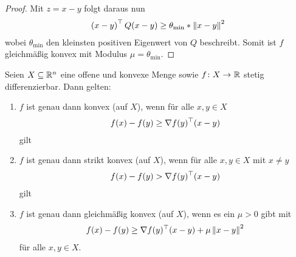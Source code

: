 \documentclass[ %
ngerman, %
a4paper, 
12pt,%
sectionreset, %
chapterstyle=framed, %
sectionstyle=pure, %
titlefont=osfamily %
]{../texmf/tex/latex/mathscriptMathTUD/mathscriptMathTUD}
\begin{document}
\begin{proof}
	Mit $z = x-y$ folgt daraus nun
	\begin{align*}
		\left( x-y \right)^{\top} Q (x-y) \geq \theta_{\min} * \left\lVert x-y \right\rVert^2
	\end{align*}
	wobei $\theta_{\min}$ den kleinsten positiven Eigenwert von $Q$ beschreibt. Somit ist $f$ gleichmäßig konvex mit Modulus $\mu = \theta_{\min}$.
\end{proof}



\begin{satz}
	Seien $X \subseteq \mathbb{R}^n$ eine offene und konvexe Menge sowie $\abb{f}{X}{\R}$ stetig differenzierbar. Dann gelten:
	\begin{enumerate}[leftmargin=*, label=(\roman*)]
		\item $f$ ist genau dann konvex (auf $X$), wenn für alle $x,y \in X$ 
		\begin{align} \label{eq: satz_konvex}
			f(x) - f(y) \geq \nabla f(y)^{\top} (x-y)
		\end{align}
		gilt
		\item $f$ ist genau dann strikt konvex (auf $X$), wenn für alle $x,y \in X$ mit $x \neq y$ 
		\begin{align} \label{eq: satz_streng_konvex}
		f(x) - f(y) > \nabla f(y)^{\top} (x-y)
		\end{align}
		gilt
		\item $f$ ist genau dann gleichmäßig konvex (auf $X$), wenn es ein $\mu > 0$ gibt mit
		\begin{align} \label{eq: satz_gleichmaessig_konvex}
		f(x) - f(y) \geq \nabla f(y)^{\top} (x-y) + \mu \left\lVert x-y \right\rVert^2
		\end{align}
		für alle $x,y \in X$.
	\end{enumerate}
\end{satz}
\end{document}
